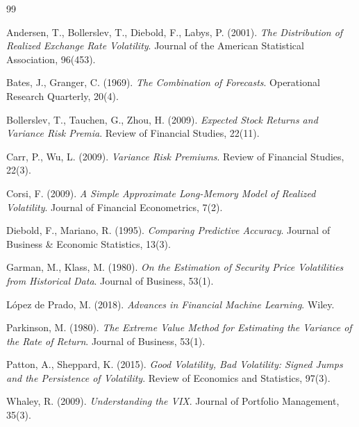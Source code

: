 \documentclass[11pt,a4paper]{article}
\begin{document}
\begin{thebibliography}{99}

 Andersen, T., Bollerslev, T., Diebold, F., Labys, P.
(2001). \emph{The Distribution of Realized Exchange Rate Volatility}. Journal
of the American Statistical Association, 96(453).

 Bates, J., Granger, C. (1969). \emph{The Combination of
Forecasts}. Operational Research Quarterly, 20(4).

 Bollerslev, T., Tauchen, G., Zhou, H. (2009). \emph{Expected
Stock Returns and Variance Risk Premia}. Review of Financial Studies, 22(11).

 Carr, P., Wu, L. (2009). \emph{Variance Risk Premiums}.
Review of Financial Studies, 22(3).

 Corsi, F. (2009). \emph{A Simple Approximate Long-Memory
Model of Realized Volatility}. Journal of Financial Econometrics, 7(2).

 Diebold, F., Mariano, R. (1995). \emph{Comparing Predictive
Accuracy}. Journal of Business \& Economic Statistics, 13(3).

 Garman, M., Klass, M. (1980). \emph{On the Estimation of
Security Price Volatilities from Historical Data}. Journal of Business, 53(1).

 López de Prado, M. (2018). \emph{Advances in Financial
Machine Learning}. Wiley.

 Parkinson, M. (1980). \emph{The Extreme Value Method
for Estimating the Variance of the Rate of Return}. Journal of Business, 53(1).

 Patton, A., Sheppard, K. (2015). \emph{Good Volatility,
Bad Volatility: Signed Jumps and the Persistence of Volatility}. Review of
Economics and Statistics, 97(3).

 Whaley, R. (2009). \emph{Understanding the VIX}. Journal
of Portfolio Management, 35(3).

\end{thebibliography}
\end{document}

